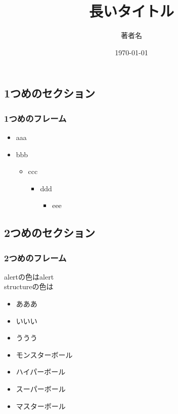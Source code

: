 \documentclass[10pt,dvipdfmx]{beamer}
\title[短いタイトル]{長いタイトル}
\author[name]{著者名}
\institute[所属]{所属}
\date{\today}
\begin{document}
\begin{frame}
  \titlepage
\end{frame}
\begin{frame}
  \tableofcontents
\end{frame}
\begin{frame}
  \section{1つめのセクション}
  \frametitle{1つめのフレーム}

  \begin{itemize}
    \item aaa
    \item bbb
    \begin{itemize}
      \item ccc
      \begin{itemize}
        \item ddd
        \begin{itemize}
          \item eee
        \end{itemize}
      \end{itemize}
    \end{itemize}
  \end{itemize}

\end{frame}
\begin{frame}
  \section{2つめのセクション}
  \frametitle{2つめのフレーム}
  alertの色は\alert{alert}\\
  structureの色は

  \begin{itemize}
    \item あああ
    \item いいい
    \item ううう
  \end{itemize}

  \begin{itemize}
    \item[\Mballitem] モンスターボール
    \item[\Mballiiitem] ハイパーボール
    \item[\Mballiitem] スーパーボール
    \item[\Mballiiiitem] マスターボール
  \end{itemize}
\end{frame}
\end{document}
